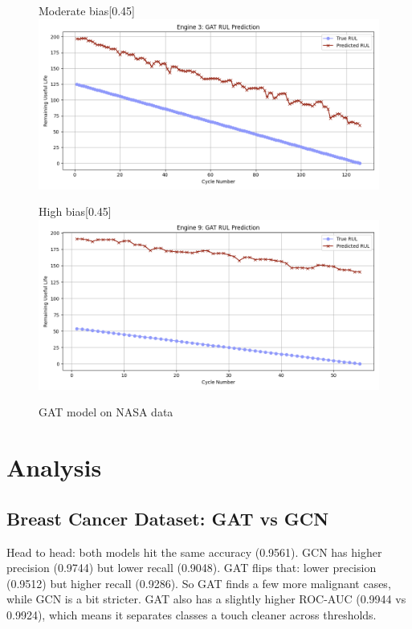 \documentclass[12pt]{article}
\begin{document}
\begin{figure}[H]
    \begin{subcaptionbox}{Moderate bias\label{fig_NASA_GAT_eng2}}[0.45\textwidth]
        {\includegraphics[width=\linewidth]{figures/NASA/NASA_GAT_eng1.png}}
    \end{subcaptionbox}
    \hfill
    \begin{subcaptionbox}{High bias\label{fig_NASA_GAT_eng3}}[0.45\textwidth]
        {\includegraphics[width=\linewidth]{figures/NASA/NASA_GAT_eng3.png}}
    \end{subcaptionbox}

    \caption{GAT model on NASA data}
    \label{GAT_NASA_all}
\end{figure}


\pagebreak
\section{Analysis} \label{sec_analysis}

\subsection{Breast Cancer Dataset: GAT vs GCN}

Head to head: both models hit the same accuracy (0.9561). GCN has higher precision (0.9744) but lower recall (0.9048). GAT flips that: lower precision (0.9512) but higher recall (0.9286). So GAT finds a few more malignant cases, while GCN is a bit stricter. GAT also has a slightly higher ROC-AUC (0.9944 vs 0.9924), which means it separates classes a touch cleaner across thresholds.
\end{document}
